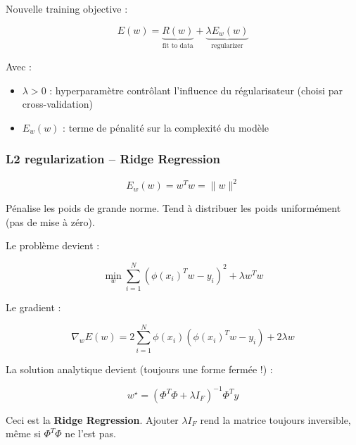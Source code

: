 \documentclass[11pt,a4paper,openany]{book}
\begin{document}
\vspace{0.5cm}

Nouvelle training objective :

\[
E(w)
=
\underbrace{R(w)}_{\text{fit to data}}
+
\underbrace{\lambda E_w(w)}_{\text{regularizer}}
\]

Avec :
\begin{itemize}
    \item $\lambda > 0$ : hyperparamètre contrôlant l'influence du régularisateur (choisi par cross-validation)
    \item $E_w(w)$ : terme de pénalité sur la complexité du modèle
\end{itemize}

\vspace{0.8cm}

\subsubsection{L2 regularization -- Ridge Regression}

\vspace{0.3cm}

\begin{defnbox}[title=L2 regularization]
\[
E_w(w)
=
w^T w = \|w\|^2
\]

Pénalise les poids de grande norme. Tend à distribuer les poids uniformément (pas de mise à zéro).
\end{defnbox}

\vspace{0.6cm}

Le problème devient :

\[
\min_w
\sum_{i=1}^{N}
\left(
\phi(x_i)^T w - y_i
\right)^2
+
\lambda w^T w
\]

\vspace{0.7cm}

Le gradient :

\[
\nabla_w E(w)
=
2
\sum_{i=1}^{N}
\phi(x_i)
\left(
\phi(x_i)^T w - y_i
\right)
+
2\lambda w
\]

\vspace{0.7cm}

La solution analytique devient (toujours une forme fermée !) :

\[
w^\star
=
\left(
\Phi^T \Phi
+
\lambda I_F
\right)^{-1}
\Phi^T y
\]

\vspace{0.5cm}

Ceci est la \textbf{Ridge Regression}. Ajouter $\lambda I_F$ rend la matrice toujours inversible, même si $\Phi^T \Phi$ ne l'est pas.
\end{document}
